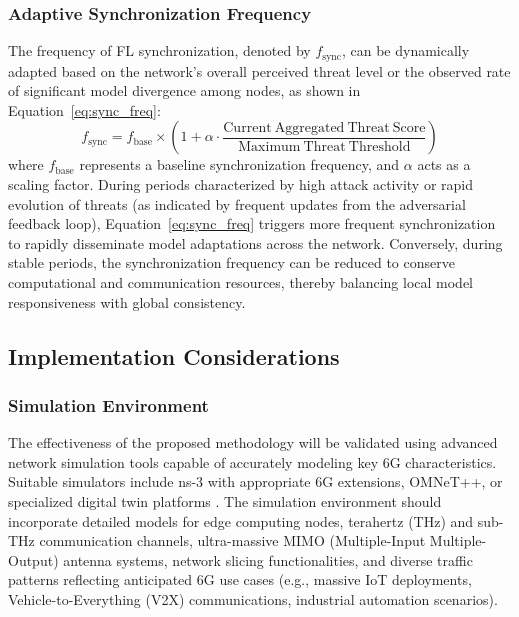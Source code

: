 \documentclass{article}
\begin{document}
\subsubsection{Adaptive Synchronization Frequency}
The frequency of FL synchronization, denoted by \( f_{\mathrm{sync}} \), can be dynamically adapted based on the network's overall perceived threat level or the observed rate of significant model divergence among nodes, as shown in Equation~\eqref{eq:sync_freq}:
\begin{equation}
\label{eq:sync_freq}
f_{\mathrm{sync}} = f_{\mathrm{base}} \times \left(1 + \alpha \cdot \frac{\mathrm{Current\ Aggregated\ Threat\ Score}}{\mathrm{Maximum\ Threat\ Threshold}}\right)
\end{equation}
where \( f_{\mathrm{base}} \) represents a baseline synchronization frequency, and \(\alpha\) acts as a scaling factor. During periods characterized by high attack activity or rapid evolution of threats (as indicated by frequent updates from the adversarial feedback loop), Equation~\eqref{eq:sync_freq} triggers more frequent synchronization to rapidly disseminate model adaptations across the network. Conversely, during stable periods, the synchronization frequency can be reduced to conserve computational and communication resources, thereby balancing local model responsiveness with global consistency.

\subsection{Implementation Considerations}
\subsubsection{Simulation Environment}
The effectiveness of the proposed methodology will be validated using advanced network simulation tools capable of accurately modeling key 6G characteristics. Suitable simulators include ns-3 with appropriate 6G extensions, OMNeT++, or specialized digital twin platforms \cite{Tao2023WirelessNDZ, Muhammad2024IntegratingGAAE}. The simulation environment should incorporate detailed models for edge computing nodes, terahertz (THz) and sub-THz communication channels, ultra-massive MIMO (Multiple-Input Multiple-Output) antenna systems, network slicing functionalities, and diverse traffic patterns reflecting anticipated 6G use cases (e.g., massive IoT deployments, Vehicle-to-Everything (V2X) communications, industrial automation scenarios).
\end{document}
